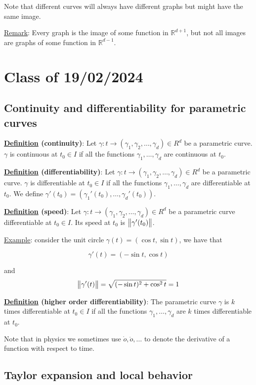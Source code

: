 \documentclass[10pt]{extarticle}
\newcommand{\R}{\mathbb{R}}
\begin{document}
Note that different curves will always have different graphs but might have the same image.

\underline{Remark}: Every graph is the image of some function in $\R^{d+1}$, but not all images are graphs of some function in $\R^{d-1}$.

\section{Class of 19/02/2024}

\subsection{Continuity and differentiability for parametric curves}

\textbf{\underline{Definition} (continuity)}: Let $\gamma: t \to (\gamma_1, \gamma_2, \ldots, \gamma_d) \in R^d$ be a parametric curve.
$\gamma$ is continuous at $t_0 \in I$ if all the functions $\gamma_1, \ldots, \gamma_d$ are continuous at $t_0$.

\textbf{\underline{Definition} (differentiability)}: Let $\gamma: t \to (\gamma_1, \gamma_2, \ldots, \gamma_d) \in R^d$ be a parametric curve.
$\gamma$ is differentiable at $t_0 \in I$ if all the functions $\gamma_1, \ldots, \gamma_d$ are differentiable at $t_0$.
We define $\gamma'(t_0) = (\gamma_1'(t_0), \ldots, \gamma_d'(t_0))$.

\textbf{\underline{Definition} (speed)}: Let $\gamma: t \to (\gamma_1, \gamma_2, \ldots, \gamma_d) \in R^d$ be a parametric curve differentiable at $t_0 \in I$.
Its speed at $t_0$ is $\norm{\gamma'(t_0)}$.

\underline{Example}: consider the unit circle $\gamma(t) = (\cos t, \sin t)$, we have that

$$
    \gamma'(t) = (-\sin t, \cos t)
$$

and
$$
    \norm{\gamma'(t)} = \sqrt{(-\sin t)^2 + \cos^2 t} = 1
$$

\textbf{\underline{Definition} (higher order differentiability)}:
The parametric curve $\gamma$ is $k$ times differentiable at $t_0 \in I$ if all the functions $\gamma_1, \ldots, \gamma_d$ are $k$ times differentiable at $t_0$.

Note that in physics we sometimes use $\dot{o}, \ddot{o}, \ldots$ to denote the derivative of a function with respect to time.

\subsection{Taylor expansion and local behavior}
\end{document}
